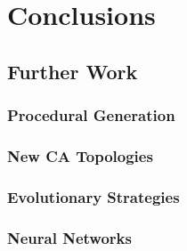 \chapter{Conclusions}

\section{Further Work}

\subsection{Procedural Generation}

\subsection{New CA Topologies}

\subsection{Evolutionary Strategies}

\subsection{Neural Networks}

